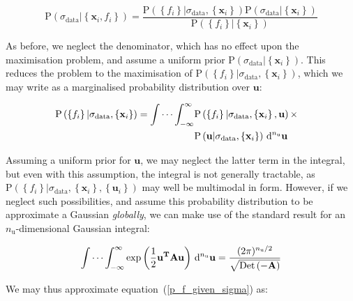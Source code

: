 \documentclass[a4paper,onecolumn,11pt]{book}
\begin{document}
\begin{equation}
\mathrm{P}\left( \sigma_\mathrm{data} | \left\{ \mathbf{x}_i, f_i \right\} \right)
= \frac{
\mathrm{P}\left( \left\{ f_i \right\} | \sigma_\mathrm{data}, \left\{ \mathbf{x}_i \right\} \right)
\mathrm{P}\left( \sigma_\mathrm{data} | \left\{ \mathbf{x}_i \right\} \right)
}{
\mathrm{P}\left( \left\{ f_i \right\} | \left\{ \mathbf{x}_i \right\} \right)
}
\end{equation}

As before, we neglect the denominator, which has no effect upon the
maximisation problem, and assume a uniform prior $\mathrm{P}\left(
\sigma_\mathrm{data} | \left\{ \mathbf{x}_i \right\} \right)$. This reduces the
problem to the maximisation of $\mathrm{P}\left( \left\{ f_i \right\} |
\sigma_\mathrm{data}, \left\{ \mathbf{x}_i \right\} \right)$, which we may
write as a marginalised probability distribution over $\mathbf{u}$:

\begin{eqnarray}
\label{p_f_given_sigma}
\mathrm{P}\left( \left\{ f_i \right\} | \sigma_\mathrm{data}, \left\{ \mathbf{x}_i \right\} \right) =
\idotsint_{-\infty}^{\infty}
&
\mathrm{P}\left( \left\{ f_i \right\} | \sigma_\mathrm{data}, \left\{ \mathbf{x}_i \right\}, \mathbf{u} \right)
\times & \\ &
\mathrm{P}\left( \mathbf{u} | \sigma_\mathrm{data}, \left\{ \mathbf{x}_i \right\} \right)
\,\mathrm{d}^{n_\mathrm{u}}\mathbf{u}
& \nonumber
\end{eqnarray}

Assuming a uniform prior for $\mathbf{u}$, we may neglect the latter term in
the integral, but even with this assumption, the integral is not generally
tractable, as $\mathrm{P}\left( \left\{ f_i \right\} | \sigma_\mathrm{data},
\left\{ \mathbf{x}_i \right\}, \left\{ \mathbf{u}_i \right\} \right)$ may well
be multimodal in form. However, if we neglect such possibilities, and assume
this probability distribution to be approximate a Gaussian \textit{globally},
we can make use of the standard result for an $n_\mathrm{u}$-dimensional Gaussian integral:

\begin{equation}
\idotsint_{-\infty}^{\infty}
\exp \left(
\frac{1}{2}\mathbf{u}^\mathbf{T} \mathbf{A} \mathbf{u}
\right) \,\mathrm{d}^{n_\mathrm{u}}\mathbf{u}
=
\frac{
(2\pi)^{n_\mathrm{u}/2}
}{
\sqrt{\mathrm{Det}\left(-\mathbf{A}\right)}
}
\end{equation}

\noindent We may thus approximate equation~(\ref{p_f_given_sigma}) as:
\end{document}
